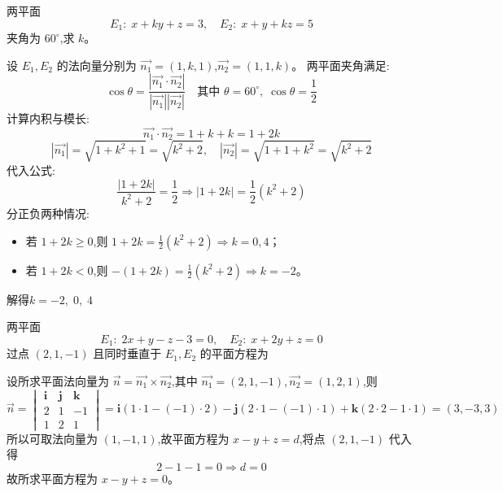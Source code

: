 \begin{questions}
    \question 两平面
    \[
    E_1:\;x + k y + z = 3, \quad E_2:\;x + y + k z = 5
    \]
    夹角为 $60^\circ$,求 $k$。  
    \begin{solution}
        设 $E_1, E_2$ 的法向量分别为  
        $\vec{n_1} = (1, k, 1)$,$\vec{n_2} = (1, 1, k)$。
        两平面夹角满足:
        \[
        \cos\theta = \frac{|\vec{n_1} \cdot \vec{n_2}|}{|\vec{n_1}||\vec{n_2}|}
        \quad \text{其中 } \theta = 60^\circ,\; \cos\theta = \frac{1}{2}
        \]
        计算内积与模长:
        \[
        \vec{n_1} \cdot \vec{n_2} = 1 + k + k = 1 + 2k
        \]
        \[
        |\vec{n_1}| = \sqrt{1 + k^2 + 1} = \sqrt{k^2 + 2},\quad
        |\vec{n_2}| = \sqrt{1 + 1 + k^2} = \sqrt{k^2 + 2}
        \]
        代入公式:
        \[
        \frac{|1 + 2k|}{k^2 + 2} = \frac{1}{2}
        \Rightarrow |1 + 2k| = \frac{1}{2}(k^2 + 2)
        \]
        分正负两种情况:
        \begin{itemize}
          \item 若 $1 + 2k \ge 0$,则 $1 + 2k = \frac{1}{2}(k^2 + 2)\Rightarrow k=0,4$；
          \item 若 $1 + 2k < 0$,则 $-(1 + 2k) = \frac{1}{2}(k^2 + 2) \Rightarrow k=-2$。
        \end{itemize}
        解得$k = -2,\; 0,\; 4$
    \end{solution}

    \question 两平面
    \[
    E_1:\;2x+y-z-3=0,\quad E_2:\;x+2y+z=0
    \]
    过点 $(2,1,-1)$ 且同时垂直于 $E_1,E_2$ 的平面方程为  
    \begin{solution}
        设所求平面法向量为 $\vec{n} = \vec{n_1} \times \vec{n_2}$,其中 $\vec{n_1} = (2,1,-1),\vec{n_2} = (1,2,1)$,则
        \[
        \vec{n} = 
        \begin{vmatrix}
        \mathbf{i} & \mathbf{j} & \mathbf{k} \\
        2 & 1 & -1 \\
        1 & 2 & 1
        \end{vmatrix}
        = \mathbf{i}(1 \cdot 1 - (-1)\cdot 2) 
        - \mathbf{j}(2 \cdot 1 - (-1)\cdot 1) 
        + \mathbf{k}(2 \cdot 2 - 1 \cdot 1) 
        = (3, -3, 3)
        \]
        所以可取法向量为 $(1, -1, 1)$,故平面方程为 $x - y + z = d$,将点 $(2,1,-1)$ 代入得
        \[
        2 - 1 - 1 = 0 \Rightarrow d = 0
        \]
        故所求平面方程为 $x - y + z = 0$。
    \end{solution}


\end{questions}
